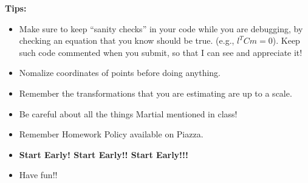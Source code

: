 \documentclass[11pt]{article}
\begin{document}
{\bf Tips:}
\begin{itemize}
\item Make sure to keep ``sanity checks'' in your code while you are debugging, by checking an equation that you know should be true. (e.g., $l^TCm=0$). Keep such code commented when you submit, so that I can see and appreciate it!
\item Nomalize coordinates of points before doing anything.
\item Remember the transformations that you are estimating are up to a scale.
\item Be careful about all the things Martial mentioned in class!
\item Remember Homework Policy available on Piazza.
\item \textbf{Start Early! Start Early!! Start Early!!!} 
\item Have fun!!
\end{itemize}
\end{document}
